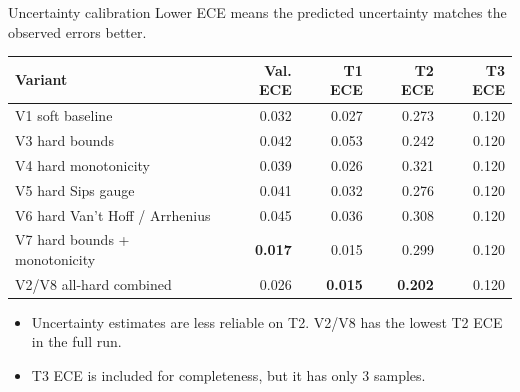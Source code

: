 \documentclass[aspectratio=169,10pt]{beamer}
\newcommand{\smallgray}[1]{\textcolor{projectGray}{#1}}
\newcommand{\best}[1]{\textbf{\textcolor{projectTeal}{#1}}}
\begin{document}
\begin{frame}{Uncertainty calibration}
  \smallgray{Lower ECE means the predicted uncertainty matches the observed errors better.}

  \vspace{0.25cm}
  \begin{table}
    \centering
    \scriptsize
    \begin{tabular}{lrrrr}
      \toprule
      \textbf{Variant}              & \textbf{Val. ECE} & \textbf{T1 ECE} & \textbf{T2 ECE} & \textbf{T3 ECE} \\
      \midrule
      V1 soft baseline              & 0.032             & 0.027           & 0.273           & 0.120           \\
      V3 hard bounds                & 0.042             & 0.053           & 0.242           & 0.120           \\
      V4 hard monotonicity          & 0.039             & 0.026           & 0.321           & 0.120           \\
      V5 hard Sips gauge            & 0.041             & 0.032           & 0.276           & 0.120           \\
      V6 hard Van't Hoff / Arrhenius & 0.045            & 0.036           & 0.308           & 0.120           \\
      V7 hard bounds + monotonicity & \best{0.017}      & 0.015           & 0.299           & 0.120           \\
      V2/V8 all-hard combined       & 0.026             & \best{0.015}    & \best{0.202}    & 0.120           \\
      \bottomrule
    \end{tabular}
  \end{table}

  \vspace{0.2cm}
  {\small
    \begin{itemize}
      \item Uncertainty estimates are less reliable on T2. V2/V8 has the lowest T2 ECE in the full run.
      \item T3 ECE is included for completeness, but it has only 3 samples.
    \end{itemize}}
\end{frame}
\end{document}
